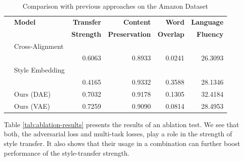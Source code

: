 \begin{table}[ht]
	\centering
	\begin{tabular}{| c | l | r | r | r | r |}
		\hline
		\multirow{2}{*}{} & \textbf{Model}        & \textbf{Transfer} & \textbf{Content}      & \textbf{Word}    & \textbf{Language} \\
		                  &                       & \textbf{Strength} & \textbf{Preservation} & \textbf{Overlap} & \textbf{Fluency}  \\
		\hline
		\hline
		\multirow{2}{*}{} & Cross-Alignment       &                   &                       &                  &                   \\
		                  & \citep{shen2017style} & 0.6063            & 0.8933                & 0.0241           & 26.3093           \\
		\hline
		\multirow{2}{*}{} & Style Embedding       &                   &                       &                  &                   \\
		                  & \citep{fu2017style}   & 0.4165            & 0.9332                & 0.3588           & 28.1346           \\
		\hline
		                  & Ours (DAE)            & 0.7032            & 0.9178                & 0.1305           & 32.4184           \\
		\hline
		                  & Ours (VAE)            & 0.7259            & 0.9090                & 0.0814           & 28.4953           \\
		\hline
	\end{tabular}
	\caption{Comparison with previous approaches on the Amazon Dataset}
	\label{tab:comparison-previous-ama}
\end{table}


Table \ref{tab:ablation-results} presents the results of an ablation test. We see that both, the adversarial loss and multi-task losses, play a role in the strength of style transfer. It also shows that their usage in a combination can further boost performance of the style-transfer strength.

